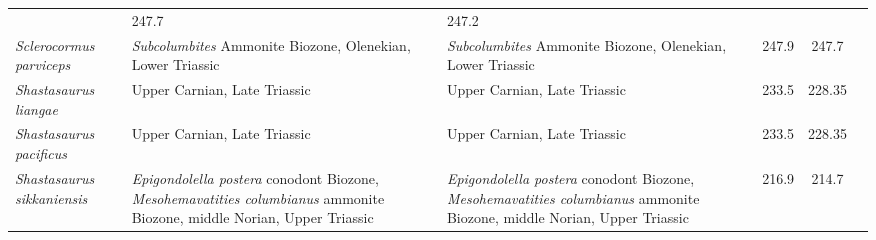 \begin{longtabu}{>{\itshape}lXXSSl}
                                                             & 247.7
                                                             & 247.2
                                                             &
                                                             \cite{Maisch2003NJGPAa} \\                    
	Sclerocormus parviceps                               &
        \emph{Subcolumbites} Ammonite Biozone, Olenekian, Lower Triassic
                                                             &
        \emph{Subcolumbites} Ammonite Biozone, Olenekian, Lower Triassic
                                                             & 247.9
                                                             & 247.7
                                                             &
                                                             \cite{Jiang2016SR,Motani2017PRSBBS} \\           
	Shastasaurus liangae                                 & Upper Carnian,
        Late Triassic
                                                             & Upper Carnian,
        Late Triassic
                                                             & 233.5
                                                             & 228.35
                                                             & \cite{Yin2000GG} \\                        
	Shastasaurus pacificus                               & Upper Carnian,
        Late Triassic
                                                             & Upper Carnian,
        Late Triassic
                                                             & 233.5
                                                             & 228.35
                                                             &
                                                             \cite{Merriam1908MUC} \\                    
	Shastasaurus sikkaniensis                            &
        \emph{Epigondolella postera} conodont Biozone, \emph{Mesohemavatities
    columbianus} ammonite Biozone, middle Norian, Upper Triassic &
    \emph{Epigondolella postera} conodont Biozone, \emph{Mesohemavatities
columbianus} ammonite Biozone, middle Norian, Upper Triassic & 216.9
                                                             & 214.7
                                                             &
                                                             \cite{Nicholls2004JVP} \\                   

\end{longtabu}

